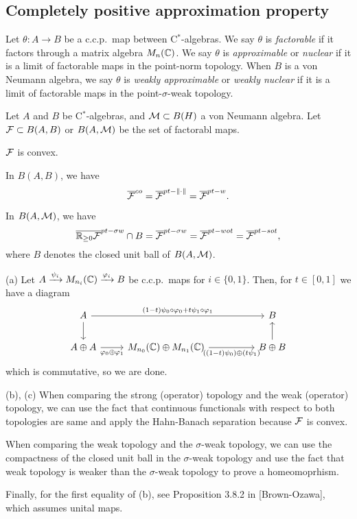 \documentclass{../../../small}
\begin{document}
\subsection{Completely positive approximation property}

\begin{defn}
Let $\theta:A\to B$ be a c.c.p.~map between C$^*$-algebras.
We say $\theta$ is \emph{factorable} if it factors through a matrix algebra $M_n(\mathbb{C})$.
We say $\theta$ is \emph{approximable} or \emph{nuclear} if it is a limit of factorable maps in the point-norm topology.
When $B$ is a von Neumann algebra, we say $\theta$ is \emph{weakly approximable} or \emph{weakly nuclear} if it is a limit of factorable maps in the point-$\sigma$-weak topology.
\end{defn}

\begin{prop}
Let $A$ and $B$ be C$^*$-algebras, and $\mathcal{M}\subset B(H)$ a von Neumann algebra.
Let $\mathcal{F}\subset B(A, B)$ or $B(A,\mathcal{M})$ be the set of factorabl maps.
\begin{parts}
\item $\mathcal{F}$ is convex.
\item In $B(A, B)$, we have
\[\overline{\mathcal{F}}^{co}=\overline{\mathcal{F}}^{pt-\|\cdot\|}=\overline{\mathcal{F}}^{pt-w}.\]
\item In $B(A,\mathcal{M})$, we have
\[\overline{\mathbb{R}_{\ge0}\mathcal{F}}^{pt-\sigma w}\cap B=\overline{\mathcal{F}}^{pt-\sigma w}=\overline{\mathcal{F}}^{pt-wot}=\overline{\mathcal{F}}^{pt-sot},\]
where $B$ denotes the closed unit ball of $B(A,\mathcal{M})$.
\end{parts}
\end{prop}
\begin{pf}[Sketch]
(a)
Let $A\xrightarrow{\psi_i}M_{n_i}(\mathbb{C})\xrightarrow{\varphi_i} B$ be c.c.p.~maps for $i\in\{0,1\}$.
Then, for $t\in[0,1]$ we have a diagram
\[\begin{tikzcd}
 A \ar{rrr}{(1-t)\psi_0\circ\f_0+t\psi_1\circ\f_1}\ar{d}&&& B\\
 A\oplus A\ar[swap]{r}{\f_0\oplus\f_1}&M_{n_0}(\C)\oplus M_{n_1}(\C)\ar[swap]{rr}{((1-t)\psi_0)\oplus(t\psi_1)}&& B\oplus B\ar{u}
\end{tikzcd}\]
which is commutative, so we are done.

(b), (c)
When comparing the strong (operator) topology and the weak (operator) topology, we can use the fact that continuous functionals with respect to both topologies are same and apply the Hahn-Banach separation because $\mathcal{F}$ is convex.

When comparing the weak topology and the $\sigma$-weak topology, we can use the compactness of the closed unit ball in the $\sigma$-weak topology and use the fact that weak topology is weaker than the $\sigma$-weak topology to prove a homeomoprhism.

Finally, for the first equality of (b), see Proposition 3.8.2 in [Brown-Ozawa], which assumes unital maps.
\end{pf}
\end{document}
